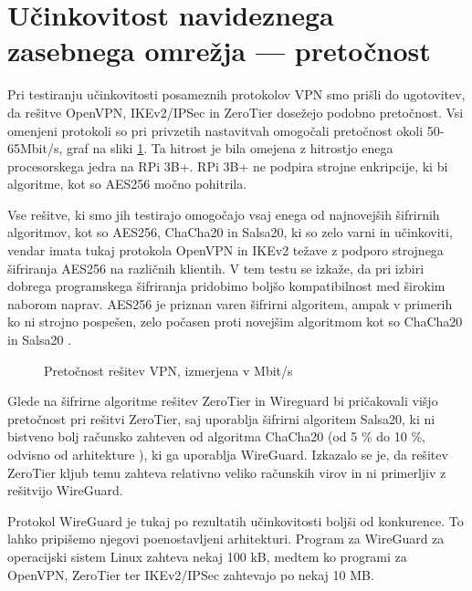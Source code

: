 \documentclass[a4paper, 12pt]{book}
\begin{document}
\section{Učinkovitost navideznega zasebnega omrežja --- pretočnost}
\label{ucinkovitost_rezultati}

Pri testiranju učinkovitosti posameznih protokolov VPN smo prišli do ugotovitev, da rešitve OpenVPN, IKEv2/IPSec in ZeroTier dosežejo podobno pretočnost. Vsi omenjeni protokoli so pri privzetih nastavitvah omogočali pretočnost okoli 50-65Mbit/s, graf na sliki \ref{pretocnost_rpi}. Ta hitrost je bila omejena z hitrostjo enega procesorskega jedra na RPi 3B+. RPi 3B+ ne podpira strojne enkripcije, ki bi algoritme, kot so AES256 močno pohitrila. %

Vse rešitve, ki smo jih testirajo omogočajo vsaj enega od najnovejših šifrirnih algoritmov, kot so AES256, ChaCha20 in Salsa20, ki so zelo varni in učinkoviti, vendar imata tukaj protokola OpenVPN in IKEv2 težave z podporo strojnega šifriranja AES256 na različnih klientih. V tem testu se izkaže, da pri izbiri dobrega programskega šifriranja pridobimo boljšo kompatibilnost med širokim naborom naprav. AES256 je priznan varen šifrirni algoritem, ampak v primerih ko ni strojno pospešen, zelo počasen proti novejšim algoritmom kot so ChaCha20 in Salsa20 \cite{stoffelen_efficient_2019}. %
\begin{figure}[h]
\begin{center}

\end{center}
\caption{Pretočnost rešitev VPN, izmerjena v Mbit/s}

\label{pretocnost_rpi}
\end{figure}

Glede na šifrirne algoritme rešitev ZeroTier in Wireguard bi pričakovali višjo pretočnost pri rešitvi ZeroTier, saj uporablja šifrirni algoritem Salsa20, ki ni bistveno bolj računsko zahteven od algoritma ChaCha20 (od 5 \% do 10 \%, odvisno od arhitekture \cite{bernstein_chacha_nodate}), ki ga uporablja WireGuard. Izkazalo se je, da rešitev ZeroTier kljub temu zahteva relativno veliko računskih virov in ni primerljiv z rešitvijo WireGuard.

Protokol WireGuard je tukaj po rezultatih učinkovitosti boljši od konkurence. To lahko pripišemo njegovi poenostavljeni arhitekturi. Program za WireGuard za operacijski sistem Linux zahteva nekaj 100 kB, medtem ko programi za OpenVPN, ZeroTier ter IKEv2/IPSec zahtevajo po nekaj 10 MB.
\end{document}
